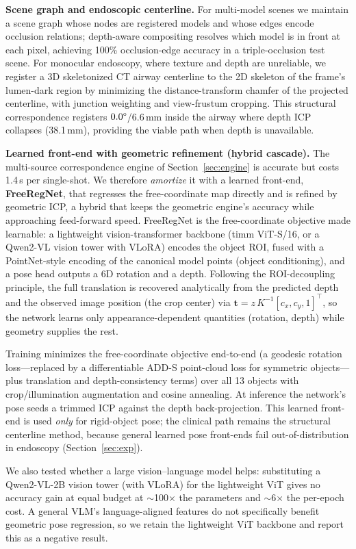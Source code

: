 \documentclass[9pt,twoside,web]{ieeecolor2}
\begin{document}
\textbf{Scene graph and endoscopic centerline.} For multi-model scenes we maintain a scene graph whose nodes are registered models and whose edges encode occlusion relations; depth-aware compositing resolves which model is in front at each pixel, achieving 100\% occlusion-edge accuracy in a triple-occlusion test scene. For monocular endoscopy, where texture and depth are unreliable, we register a 3D skeletonized CT airway centerline to the 2D skeleton of the frame's lumen-dark region by minimizing the distance-transform chamfer of the projected centerline, with junction weighting and view-frustum cropping. This structural correspondence registers $0.0\degree$/6.6\,mm inside the airway where depth ICP collapses (38.1\,mm), providing the viable path when depth is unavailable.

\textbf{Learned front-end with geometric refinement (hybrid cascade).} The multi-source correspondence engine of Section~\ref{sec:engine} is accurate but costs 1.4\,s per single-shot. We therefore \emph{amortize} it with a learned front-end, \textbf{FreeRegNet}, that regresses the free-coordinate map directly and is refined by geometric ICP, a hybrid that keeps the geometric engine's accuracy while approaching feed-forward speed. FreeRegNet is the free-coordinate objective made learnable: a lightweight vision-transformer backbone (timm ViT-S/16, or a Qwen2-VL vision tower with VLoRA) encodes the object ROI, fused with a PointNet-style encoding of the canonical model points (object conditioning), and a pose head outputs a 6D rotation and a depth. Following the ROI-decoupling principle, the full translation is recovered analytically from the predicted depth and the observed image position (the crop center) via $\mathbf{t}=z\,K^{-1}[c_{x},c_{y},1]^{\top}$, so the network learns only appearance-dependent quantities (rotation, depth) while geometry supplies the rest.

Training minimizes the free-coordinate objective end-to-end (a geodesic rotation loss---replaced by a differentiable ADD-S point-cloud loss for symmetric objects---plus translation and depth-consistency terms) over all 13 objects with crop/illumination augmentation and cosine annealing. At inference the network's pose seeds a trimmed ICP against the depth back-projection. This learned front-end is used \emph{only} for rigid-object pose; the clinical path remains the structural centerline method, because general learned pose front-ends fail out-of-distribution in endoscopy (Section~\ref{sec:exp}).

We also tested whether a large vision--language model helps: substituting a Qwen2-VL-2B vision tower (with VLoRA) for the lightweight ViT gives no accuracy gain at equal budget at $\sim$100$\times$ the parameters and $\sim$6$\times$ the per-epoch cost. A general VLM's language-aligned features do not specifically benefit geometric pose regression, so we retain the lightweight ViT backbone and report this as a negative result.
\end{document}
